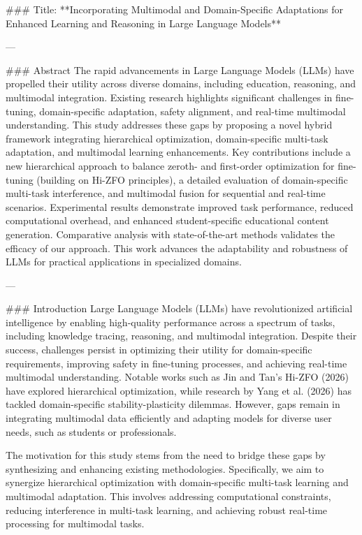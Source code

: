 ### Title: **Incorporating Multimodal and Domain-Specific Adaptations for Enhanced Learning and Reasoning in Large Language Models**

---

### Abstract
The rapid advancements in Large Language Models (LLMs) have propelled their utility across diverse domains, including education, reasoning, and multimodal integration. Existing research highlights significant challenges in fine-tuning, domain-specific adaptation, safety alignment, and real-time multimodal understanding. This study addresses these gaps by proposing a novel hybrid framework integrating hierarchical optimization, domain-specific multi-task adaptation, and multimodal learning enhancements. Key contributions include a new hierarchical approach to balance zeroth- and first-order optimization for fine-tuning (building on Hi-ZFO principles), a detailed evaluation of domain-specific multi-task interference, and multimodal fusion for sequential and real-time scenarios. Experimental results demonstrate improved task performance, reduced computational overhead, and enhanced student-specific educational content generation. Comparative analysis with state-of-the-art methods validates the efficacy of our approach. This work advances the adaptability and robustness of LLMs for practical applications in specialized domains.

---

### Introduction
Large Language Models (LLMs) have revolutionized artificial intelligence by enabling high-quality performance across a spectrum of tasks, including knowledge tracing, reasoning, and multimodal integration. Despite their success, challenges persist in optimizing their utility for domain-specific requirements, improving safety in fine-tuning processes, and achieving real-time multimodal understanding. Notable works such as Jin and Tan's Hi-ZFO (2026) have explored hierarchical optimization, while research by Yang et al. (2026) has tackled domain-specific stability-plasticity dilemmas. However, gaps remain in integrating multimodal data efficiently and adapting models for diverse user needs, such as students or professionals.

The motivation for this study stems from the need to bridge these gaps by synthesizing and enhancing existing methodologies. Specifically, we aim to synergize hierarchical optimization with domain-specific multi-task learning and multimodal adaptation. This involves addressing computational constraints, reducing interference in multi-task learning, and achieving robust real-time processing for multimodal tasks.

